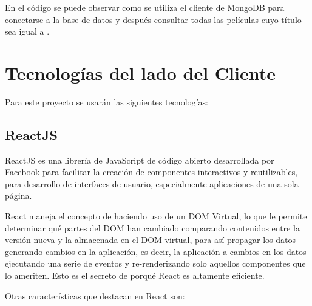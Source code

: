 En el código se puede observar como se utiliza el cliente de MongoDB para conectarse a la base de datos  y después consultar todas las películas cuyo título sea igual a .

\section{Tecnologías del lado del Cliente}

Para este proyecto se usarán las siguientes tecnologías:

\subsection{ReactJS}

ReactJS es una librería de JavaScript de código abierto desarrollada por Facebook para facilitar la creación de componentes interactivos y reutilizables, para desarrollo de interfaces de usuario, especialmente aplicaciones de una sola página.

React maneja el concepto de  \cite{ReactiveProgramming} haciendo uso de un DOM Virtual, lo que le permite determinar qué partes del DOM han cambiado comparando contenidos entre la versión nueva y la almacenada en el DOM virtual, para así propagar los datos generando cambios en la aplicación, es decir, la aplicación  a cambios en los datos ejecutando una serie de eventos y re-renderizando solo aquellos componentes que lo ameriten. Esto es el secreto de porqué React es altamente eficiente.

Otras características que destacan en React son:

